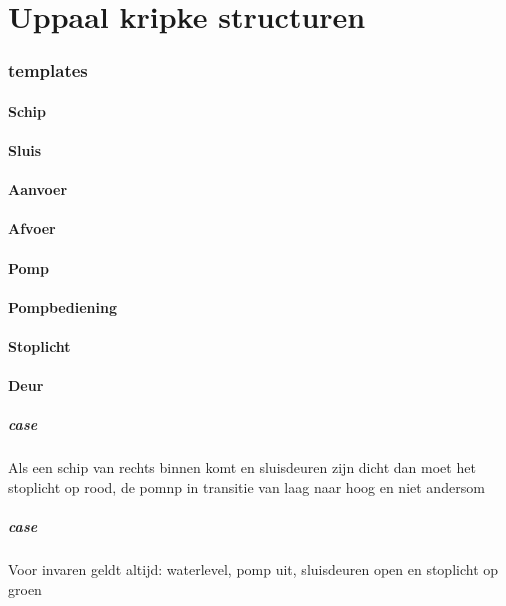 
\section{Uppaal kripke structuren}


\subsubsection{templates}

\paragraph{Schip}

\paragraph{Sluis}


\paragraph{Aanvoer}


\paragraph{Afvoer}

\paragraph{Pomp}

\paragraph{Pompbediening}


\paragraph{Stoplicht}

\paragraph{Deur}


\subparagraph{case}
Als een schip van rechts binnen komt en sluisdeuren zijn dicht dan moet het stoplicht op rood, de pomnp in transitie van laag naar hoog en niet andersom

\subparagraph{case}
Voor invaren geldt altijd: waterlevel, pomp uit, sluisdeuren open en stoplicht op groen

